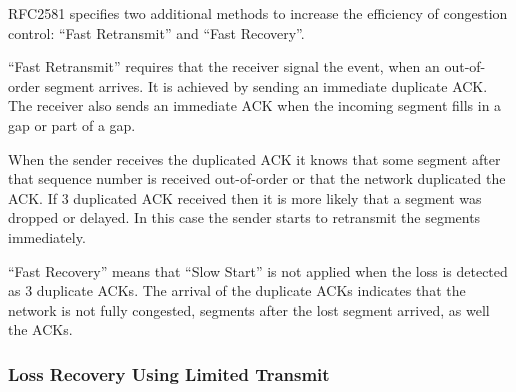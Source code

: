 RFC2581 specifies two additional methods to increase the efficiency
of congestion control: ``Fast Retransmit'' and ``Fast Recovery''.

``Fast Retransmit'' requires that the receiver signal the event,
when an out-of-order segment arrives. It is achieved by sending
an immediate duplicate ACK. The receiver also sends an immediate
ACK when the incoming segment fills in a gap or part of a gap.

When the sender receives the duplicated ACK it knows that some
segment after that sequence number is received out-of-order or
that the network duplicated the ACK. If 3 duplicated ACK received
then it is more likely that a segment was dropped or delayed.
In this case the sender starts to retransmit the segments
immediately.

``Fast Recovery'' means that ``Slow Start'' is not applied
when the loss is detected as 3 duplicate ACKs. The arrival
of the duplicate ACKs indicates that the network is not fully
congested, segments after the lost segment arrived, as well
the ACKs.

%
%
%
%
%
%

\subsubsection*{Loss Recovery Using Limited Transmit}

